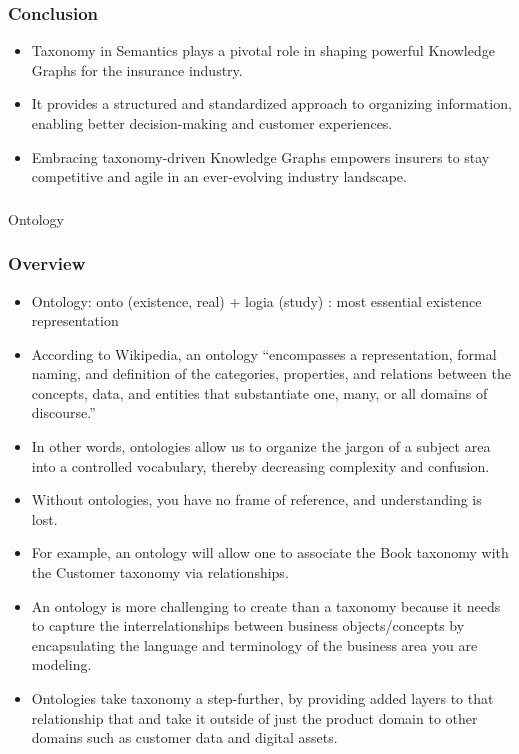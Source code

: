 \begin{frame}[fragile]
\frametitle{Conclusion}
\begin{itemize}
\item Taxonomy in Semantics plays a pivotal role in shaping powerful Knowledge Graphs for the insurance industry.
\item It provides a structured and standardized approach to organizing information, enabling better decision-making and customer experiences.
\item Embracing taxonomy-driven Knowledge Graphs empowers insurers to stay competitive and agile in an ever-evolving industry landscape.
\end{itemize}
\end{frame}


\begin{frame}[fragile]\frametitle{}
\begin{center}
{\Large Ontology }
\end{center}
\end{frame}

\begin{frame}[fragile]
\frametitle{Overview}
\begin{itemize}
\item Ontology: onto (existence, real) + logia (study) : most essential existence representation
\item According to Wikipedia, an ontology “encompasses a representation, formal naming, and definition of the categories, properties, and relations between the concepts, data, and entities that substantiate one, many, or all domains of discourse.”
\item In other words, ontologies allow us to organize the jargon of a subject area into a controlled vocabulary, thereby decreasing complexity and confusion. 
\item Without ontologies, you have no frame of reference, and understanding is lost.
\item For example, an ontology will allow one to associate the Book taxonomy with the Customer taxonomy via relationships.
\item An ontology is more challenging to create than a taxonomy because it needs to capture the interrelationships between business objects/concepts by encapsulating the language and terminology of the business area you are modeling.
\item Ontologies take taxonomy a step-further, by providing added layers to that relationship that and take it outside of just the product domain to other domains such as customer data and digital assets.   
\end{itemize}
\end{frame}

